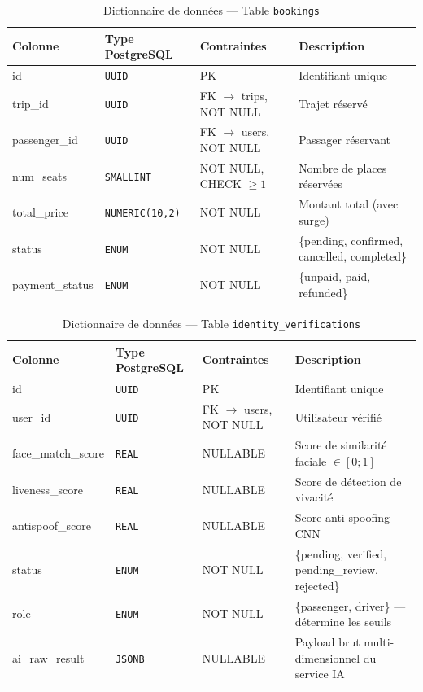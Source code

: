 \begin{table}[H]
\centering
\footnotesize
\begin{tabularx}{\textwidth}{|l|l|l|X|}
\hline
\rowcolor{rohlight}
\textbf{Colonne} & \textbf{Type PostgreSQL} & \textbf{Contraintes} & \textbf{Description} \\
\hline
id & \texttt{UUID} & PK & Identifiant unique \\
\hline
trip\_id & \texttt{UUID} & FK $\to$ trips, NOT NULL & Trajet réservé \\
\hline
passenger\_id & \texttt{UUID} & FK $\to$ users, NOT NULL & Passager réservant \\
\hline
num\_seats & \texttt{SMALLINT} & NOT NULL, CHECK $\geq 1$ & Nombre de places réservées \\
\hline
total\_price & \texttt{NUMERIC(10,2)} & NOT NULL & Montant total (avec surge) \\
\hline
status & \texttt{ENUM} & NOT NULL & \{pending, confirmed, cancelled, completed\} \\
\hline
payment\_status & \texttt{ENUM} & NOT NULL & \{unpaid, paid, refunded\} \\
\hline
\end{tabularx}
  \caption{Dictionnaire de données --- Table \texttt{bookings}}
  \label{tab:dd-bookings}
\end{table}

\begin{table}[H]
\centering
\footnotesize
\begin{tabularx}{\textwidth}{|l|l|l|X|}
\hline
\rowcolor{rohlight}
\textbf{Colonne} & \textbf{Type PostgreSQL} & \textbf{Contraintes} & \textbf{Description} \\
\hline
id & \texttt{UUID} & PK & Identifiant unique \\
\hline
user\_id & \texttt{UUID} & FK $\to$ users, NOT NULL & Utilisateur vérifié \\
\hline
face\_match\_score & \texttt{REAL} & NULLABLE & Score de similarité faciale $\in [0; 1]$ \\
\hline
liveness\_score & \texttt{REAL} & NULLABLE & Score de détection de vivacité \\
\hline
antispoof\_score & \texttt{REAL} & NULLABLE & Score anti-spoofing CNN \\
\hline
status & \texttt{ENUM} & NOT NULL & \{pending, verified, pending\_review, rejected\} \\
\hline
role & \texttt{ENUM} & NOT NULL & \{passenger, driver\} --- détermine les seuils \\
\hline
ai\_raw\_result & \texttt{JSONB} & NULLABLE & Payload brut multi-dimensionnel du service IA \\
\hline
\end{tabularx}
  \caption{Dictionnaire de données --- Table \texttt{identity\_verifications}}
  \label{tab:dd-kyc}
\end{table}

